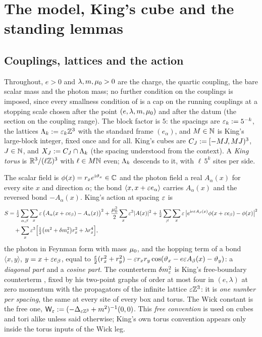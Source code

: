 \section{The model, King's cube and the standing lemmas}

\subsection{Couplings, lattices and the action}

Throughout, $e>0$ and $\lambda,m,\mu_0>0$ are the charge, the quartic coupling, the bare scalar mass and the photon mass; no further condition on the couplings is imposed, since every smallness condition of \cite{K1,K2,Ba1,Ba2,Ba3,Ba4} is a cap on the running couplings at a stopping scale chosen after the point $(e,\lambda,m,\mu_0)$ and after the datum (the section on the coupling range). The block factor is $5$: the spacings are $\varepsilon_k:=5^{-k}$, the lattices $\Lambda_k:=\varepsilon_k\mathbb Z^3$ with the standard frame $(e_\alpha)$, and $M\in\mathbb N$ is King's large-block integer, fixed once and for all. King's cubes are $C_J:=[-MJ,MJ)^3$, $J\in\mathbb N$, and $X_J:=C_J\cap\Lambda_k$ (the spacing understood from the context). A \emph{King torus} is $\mathbb R^3/(\ell\mathbb Z)^3$ with $\ell\in M\mathbb N$ even; $\Lambda_k$ descends to it, with $\ell\,5^k$ sites per side.

The scalar field is $\phi(x)=r_xe^{\mathrm i\vartheta_x}\in\mathbb C$ and the photon field a real $A_\alpha(x)$ for every site $x$ and direction $\alpha$; the bond $\langle x,x+\varepsilon e_\alpha\rangle$ carries $A_\alpha(x)$ and the reversed bond $-A_\alpha(x)$. King's action \cite[(2.5)]{K2} at spacing $\varepsilon$ is
\begin{equation*}
\begin{aligned}
S&=\tfrac12\sum_{\alpha,\beta}\sum_x\varepsilon\,\big(A_\alpha(x+\varepsilon e_\beta)-A_\alpha(x)\big)^2+\frac{\mu_0^2}2\sum_x\varepsilon^3|A(x)|^2
+\tfrac12\sum_\beta\sum_x\varepsilon\,\big|e^{\mathrm ie\varepsilon A_\beta(x)}\phi(x+\varepsilon e_\beta)-\phi(x)\big|^2\\
&\quad+\sum_x\varepsilon^3\Big[\tfrac12\big(m^2+\delta m^2_{\varepsilon}\big)r_x^2+\lambda r_x^4\Big],
\end{aligned}
\end{equation*}
the photon in Feynman form with mass $\mu_0$, and the hopping term of a bond $\langle x,y\rangle$, $y=x+\varepsilon e_\beta$, equal to $\frac{\varepsilon}2(r_x^2+r_y^2)-\varepsilon r_xr_y\cos(\vartheta_x-e\varepsilon A_\beta(x)-\vartheta_y)$: a \emph{diagonal part} and a \emph{cosine part}. The counterterm $\delta m^2_{\varepsilon}$ is King's free-boundary counterterm \cite[p.~330]{K2}, fixed by his two-point graphs of order at most four in $(e,\lambda)$ at zero momentum with the propagators of the infinite lattice $\varepsilon\mathbb Z^3$: it is \emph{one number per spacing}, the same at every site of every box and torus. The Wick constant is the free one, $\mathsf W_{\varepsilon}:=(-\Delta_{\varepsilon\mathbb Z^3}+m^2)^{-1}(0,0)$. This \emph{free convention} is used on cubes and tori alike unless said otherwise; King's own torus convention appears only inside the torus inputs of the Wick leg.

